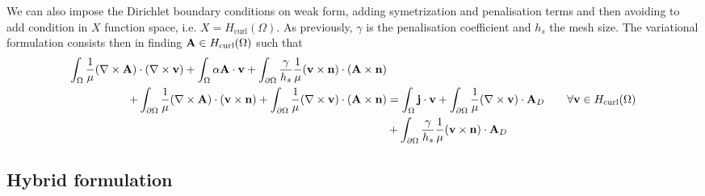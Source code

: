 We can also impose the Dirichlet boundary conditions on weak form, adding
symetrization and penalisation terms and then avoiding to add condition in $X$
function space, i.e. $X = H_{\mathrm{curl}}(\Omega)$. As previously, $\gamma$ is
the penalisation coefficient and $h_s$ the mesh size. The variational
formulation consists then in finding $\mathbf{A} \in H_{\mathrm{curl}}(\Omega)$ such
that
\begin{alignat}{2}
  \int_{\Omega}\frac{1}{\mu}(\nabla \times \mathbf{A}) \cdot (\nabla \times \mathbf{v})
  + \int_{\Omega}\alpha \mathbf{A} \cdot \mathbf{v}
  + \int_{\partial \Omega} \frac{\gamma}{h_s} \frac{1}{\mu}
  (\mathbf{v} \times \mathbf{n} ) \cdot (\mathbf{A} \times \mathbf{n} ) &&& \nonumber \\
  + \int_{\partial \Omega}\frac{1}{\mu} (\nabla \times \mathbf{A}) \cdot (\mathbf{v}\times\mathbf{n})
  + \int_{\partial \Omega}\frac{1}{\mu} (\nabla \times \mathbf{v}) \cdot (\mathbf{A}\times\mathbf{n})
  &=
  \int_{\Omega} \mathbf{j} \cdot \mathbf{v}
  + \int_{\partial \Omega}\frac{1}{\mu} (\nabla \times \mathbf{v}) \cdot \mathbf{A}_D
  && \quad \forall \mathbf{v} \in H_{\mathrm{curl}}(\Omega) \label{eq:vf-regul-weak} \\
  & + \int_{\partial\Omega} \frac{\gamma}{h_s} \frac{1}{\mu}
  (\mathbf{v} \times \mathbf{n}) \cdot \mathbf{A}_D \nonumber
\end{alignat}

\subsection{Hybrid formulation}
